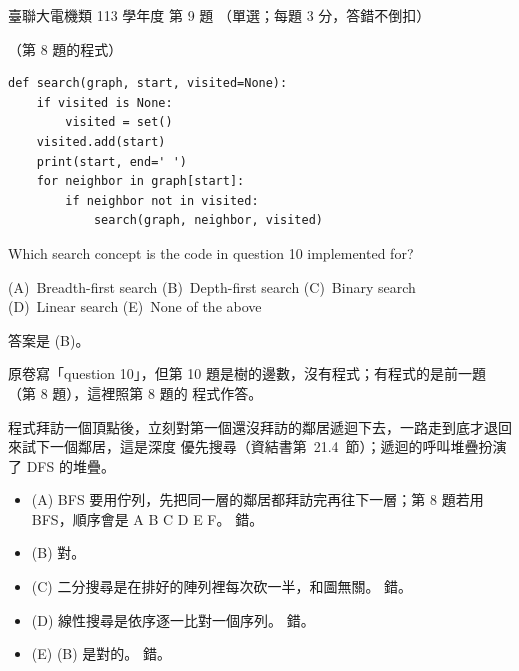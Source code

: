 \begin{pastexam}[label={px:ust-113-ee-ds-09}]{臺聯大電機類 113 學年度 第 9 題}
（單選；每題 3 分，答錯不倒扣）

（第 8 題的程式）
\begin{verbatim}
def search(graph, start, visited=None):
    if visited is None:
        visited = set()
    visited.add(start)
    print(start, end=' ')
    for neighbor in graph[start]:
        if neighbor not in visited:
            search(graph, neighbor, visited)
\end{verbatim}

Which search concept is the code in question 10 implemented for?

(A)~Breadth-first search \qquad (B)~Depth-first search \qquad (C)~Binary search\\
(D)~Linear search \qquad (E)~None of the above
\end{pastexam}

\begin{pastsoln}
答案是 (B)。

原卷寫「question 10」，但第 10 題是樹的邊數，沒有程式；有程式的是前一題（第 8 題），這裡照第 8 題的
程式作答。

程式拜訪一個頂點後，立刻對第一個還沒拜訪的鄰居遞迴下去，一路走到底才退回來試下一個鄰居，這是深度
優先搜尋（資結書第~21.4~節）；遞迴的呼叫堆疊扮演了 DFS 的堆疊。
\begin{itemize}
\item (A) BFS 要用佇列，先把同一層的鄰居都拜訪完再往下一層；第 8 題若用 BFS，順序會是
A B C D E F。 錯。
\item (B) 對。
\item (C) 二分搜尋是在排好的陣列裡每次砍一半，和圖無關。 錯。
\item (D) 線性搜尋是依序逐一比對一個序列。 錯。
\item (E) (B) 是對的。 錯。
\end{itemize}
\end{pastsoln}
